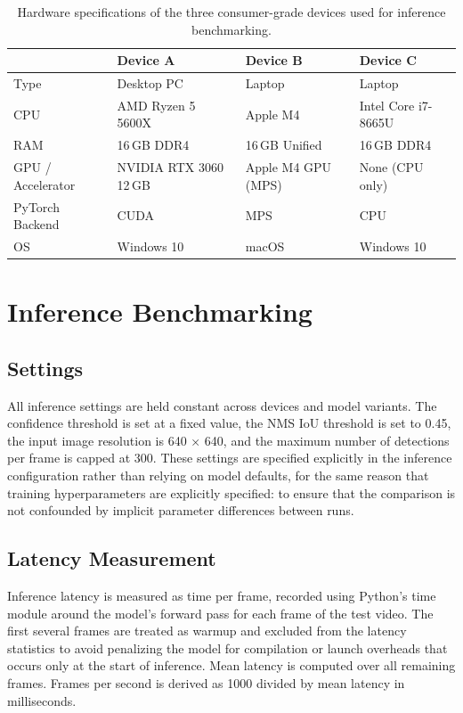 \begin{table}[h]
\centering
\label{tab:hardware}
\begin{tabular}{lp{3.5cm}p{3.5cm}p{3.5cm}}
\hline
\textbf{} & \textbf{Device A} & \textbf{Device B} & \textbf{Device C} \\
\hline
Type                & Desktop PC             & Laptop                  & Laptop                  \\ \hline
CPU                 & AMD Ryzen 5 5600X      & Apple M4                & Intel Core i7-8665U     \\ \hline
RAM                 & 16\,GB DDR4            & 16\,GB Unified          & 16\,GB DDR4             \\ \hline
GPU / Accelerator   & NVIDIA RTX 3060 12\,GB & Apple M4 GPU (MPS)      & None (CPU only)         \\ \hline
PyTorch Backend     & CUDA                   & MPS                     & CPU                     \\ \hline
OS                  & Windows 10             & macOS                   & Windows 10              \\ \hline
\end{tabular}
\caption{Hardware specifications of the three consumer-grade devices used for inference benchmarking.}
\end{table}

\section{Inference Benchmarking}
\subsection{Settings}
All inference settings are held constant across devices and model variants. The confidence threshold is set at a fixed value, the NMS IoU threshold is set to 0.45, the input image resolution is 640 × 640, and the maximum number of detections per frame is capped at 300. These settings are specified explicitly in the inference configuration rather than relying on model defaults, for the same reason that training hyperparameters are explicitly specified: to ensure that the comparison is not confounded by implicit parameter differences between runs.

\subsection{Latency Measurement}
Inference latency is measured as time per frame, recorded using Python's time module around the model's forward pass for each frame of the test video. The first several frames are treated as warmup and excluded from the latency statistics to avoid penalizing the model for compilation or launch overheads that occurs only at the start of inference. Mean latency is computed over all remaining frames. Frames per second is derived as 1000 divided by mean latency in milliseconds.

